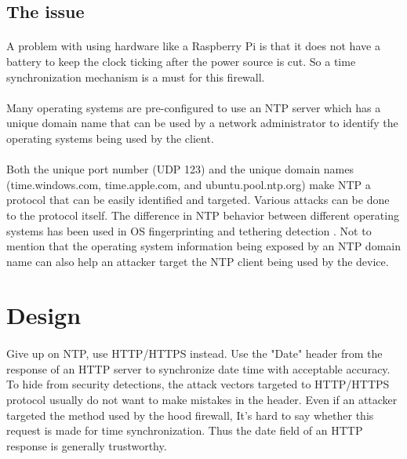 \documentclass[mscthesis]{usiinfthesis}
\begin{document}
\subsection{The issue}
\paragraph{}
A problem with using hardware like a Raspberry Pi is that it does not have a battery to keep the clock ticking after the power source is cut. So a time synchronization mechanism is a must for this firewall.
\paragraph{}
Many operating systems are pre-configured to use an NTP server which has a unique domain name that can be used by a network administrator to identify the operating systems being used by the client.
\paragraph{}
Both the unique port number (UDP 123) and the unique domain names (time.windows.com, time.apple.com, and ubuntu.pool.ntp.org) make NTP a protocol that can be easily identified and targeted. Various attacks can be done to the protocol itself\citep{ntp:attack}. The difference in NTP behavior between different operating systems has been used in OS fingerprinting and tethering detection \citep{osandtether}. Not to mention that the operating system information being exposed by an NTP domain name can also help an attacker target the NTP client being used by the device.

\section{Design}
\paragraph{}
Give up on NTP, use HTTP/HTTPS instead. Use the "Date" header from the response of an HTTP server to synchronize date time with acceptable accuracy. To hide from security detections, the attack vectors targeted to HTTP/HTTPS protocol usually do not want to make mistakes in the header. Even if an attacker targeted the method used by the hood firewall, It's hard to say whether this request is made for time synchronization. Thus the date field of an HTTP response is generally trustworthy.
\end{document}
